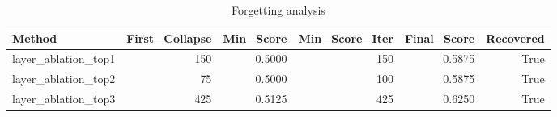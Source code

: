 \begin{table}[htbp]
\centering
\caption{Forgetting analysis}
\label{tab:forgetting}
\begin{tabular}{lrrrrr}
\toprule
\textbf{Method} & \textbf{First\_Collapse} & \textbf{Min\_Score} & \textbf{Min\_Score\_Iter} & \textbf{Final\_Score} & \textbf{Recovered} \\
\midrule
layer\_ablation\_top1 & 150 & 0.5000 & 150 & 0.5875 & True \\
layer\_ablation\_top2 & 75 & 0.5000 & 100 & 0.5875 & True \\
layer\_ablation\_top3 & 425 & 0.5125 & 425 & 0.6250 & True \\
\bottomrule
\end{tabular}
\end{table}